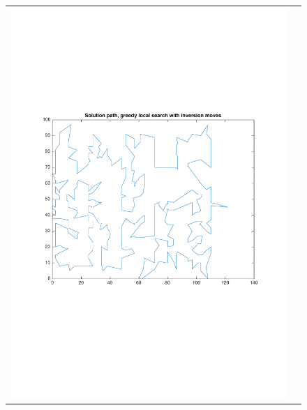 \documentclass[a4paper, 11pt]{scrartcl}
\begin{document}
\begin{figure}[!ht]
\begin{tabular}{cc}
    \includegraphics[scale=0.4, trim={3cm 6cm 1cm 6cm}]{../figures/solutionPath_inversion.pdf} & 

\end{tabular}
\end{figure}
\end{document}
